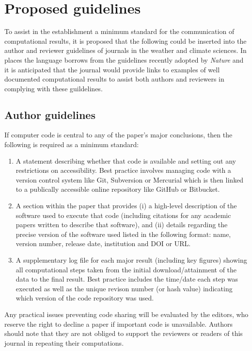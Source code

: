 \section{Proposed guidelines}\label{s:guidelines}

To assist in the establishment a minimum standard for the communication of computational results, it is proposed that the following could be inserted into the author and reviewer guidelines of journals in the weather and climate sciences. In places the language borrows from the guidelines recently adopted by \textit{Nature} \citep{Nature2014} and it is anticipated that the journal would provide links to examples of well documented computational results to assist both authors and reviewers in complying with these guildelines.

\subsection{Author guidelines}

If computer code is central to any of the paper's major conclusions, then the following is required as a minimum standard: 
\begin{enumerate}
\item A statement describing whether that code is available and setting out any restrictions on accessibility. Best practice involves managing code with a version control system like Git, Subversion or Mercurial which is then linked to a publically accessible online repository like GitHub or Bitbucket. 
\item A section within the paper that provides (i) a high-level description of the software used to execute that code (including citations for any academic papers written to describe that software), and (ii) details regarding the precise version of the software used listed in the following format: name, version number, release date, institution and DOI or URL.
\item A supplementary log file for each major result (including key figures) showing all computational steps taken from the initial download/attainment of the data to the final result. Best practice includes the time/date each step was executed as well as the unique revison number (or hash value) indicating which version of the code repository was used.
\end{enumerate}

Any practical issues preventing code sharing will be evaluated by the editors, who reserve the right to decline a paper if important code is unavailable. Authors should note that they are not obliged to support the reviewers or readers of this journal in repeating their computations.